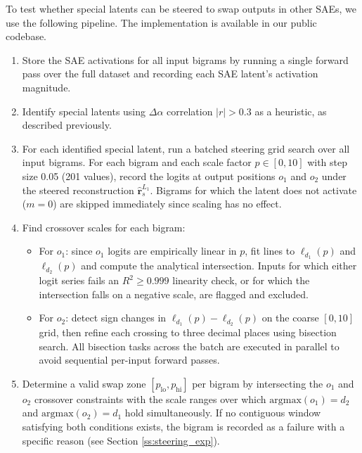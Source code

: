 
To test whether special latents can be steered to swap outputs in other SAEs, we use the following pipeline. The implementation is available in our public codebase.
\begin{enumerate}
    \item Store the SAE activations for all input bigrams by running a single 
    forward pass over the full dataset and recording each SAE latent's activation 
    magnitude.
    \item Identify special latents using $\Delta \alpha$ correlation $|r|>0.3$ as a heuristic, 
    as described previously.
    \item For each identified special latent, run a batched steering grid search 
    over all input bigrams. For each bigram and each scale factor 
    $p \in [0,10]$ with step size 0.05 (201 values), record the logits at 
    output positions $o_1$ and $o_2$ under the steered reconstruction 
    $\hat{\boldsymbol{r}}_{s}^{L_1}$. Bigrams for which the latent does not 
    activate ($m = 0$) are skipped immediately since scaling has no effect.
    
    \item Find crossover scales for each bigram:
    \begin{itemize}
        \item For $o_1$: since $o_1$ logits are empirically linear in $p$, fit 
        lines to $\ell_{d_1}(p)$ and $\ell_{d_2}(p)$ and compute the analytical 
        intersection. Inputs for which either logit series fails an $R^2 \geq 0.999$ 
        linearity check, or for which the intersection falls on a negative scale, are flagged and excluded.
        \item For $o_2$: detect sign changes in $\ell_{d_1}(p) - \ell_{d_2}(p)$ 
        on the coarse $[0, 10]$ grid, then refine each crossing to three decimal places using 
        bisection search. All bisection tasks across the batch are executed in parallel to 
        avoid sequential per-input forward passes.
    \end{itemize}
    
    \item Determine a valid swap zone $[p_{\mathrm{lo}}, p_{\mathrm{hi}}]$ per 
    bigram by intersecting the $o_1$ and $o_2$ crossover constraints with the 
    scale ranges over which $\mathrm{argmax}(o_1) = d_2$ and 
    $\mathrm{argmax}(o_2) = d_1$ hold simultaneously. If no contiguous window 
    satisfying both conditions exists, the bigram is recorded as a failure with a 
    specific reason (see Section \ref{ss:steering_exp}).
    

\end{enumerate}
